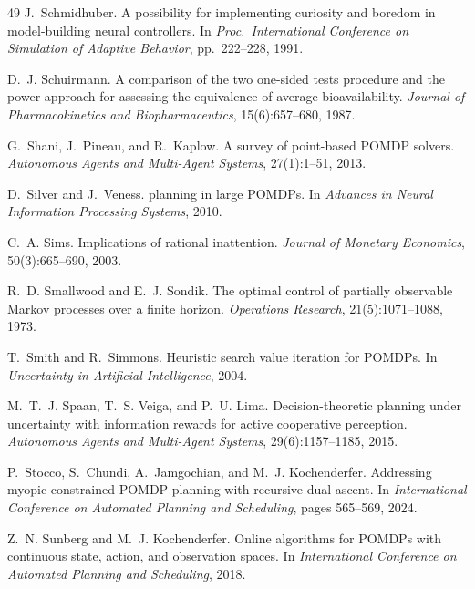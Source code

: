 \documentclass[runningheads]{llncs}
\begin{document}
\begin{thebibliography}{49}
J.~Schmidhuber.
\newblock A possibility for implementing curiosity and boredom in model-building neural controllers.
\newblock In \emph{Proc.\ International Conference on Simulation of Adaptive Behavior}, pp.\ 222--228, 1991.

D.~J. Schuirmann.
\newblock A comparison of the two one-sided tests procedure and the power approach for assessing the equivalence of average bioavailability.
\newblock \emph{Journal of Pharmacokinetics and Biopharmaceutics}, 15(6):657--680, 1987.

G.~Shani, J.~Pineau, and R.~Kaplow.
\newblock A survey of point-based {POMDP} solvers.
\newblock \emph{Autonomous Agents and Multi-Agent Systems}, 27(1):1--51, 2013.

D.~Silver and J.~Veness.
 planning in large {POMDP}s.
\newblock In \emph{Advances in Neural Information Processing Systems}, 2010.

C.~A. Sims.
\newblock Implications of rational inattention.
\newblock \emph{Journal of Monetary Economics}, 50(3):665--690, 2003.

R.~D. Smallwood and E.~J. Sondik.
\newblock The optimal control of partially observable {M}arkov processes over a finite horizon.
\newblock \emph{Operations Research}, 21(5):1071--1088, 1973.

T.~Smith and R.~Simmons.
\newblock Heuristic search value iteration for {POMDP}s.
\newblock In \emph{Uncertainty in Artificial Intelligence}, 2004.

M.~T.~J. Spaan, T.~S. Veiga, and P.~U. Lima.
\newblock Decision-theoretic planning under uncertainty with information rewards for active cooperative perception.
\newblock \emph{Autonomous Agents and Multi-Agent Systems}, 29(6):1157--1185, 2015.

P.~Stocco, S.~Chundi, A.~Jamgochian, and M.~J. Kochenderfer.
\newblock Addressing myopic constrained {POMDP} planning with recursive dual ascent.
\newblock In \emph{International Conference on Automated Planning and Scheduling}, pages 565--569, 2024.

Z.~N. Sunberg and M.~J. Kochenderfer.
\newblock Online algorithms for {POMDP}s with continuous state, action, and observation spaces.
\newblock In \emph{International Conference on Automated Planning and Scheduling}, 2018.


\end{thebibliography}
\end{document}
